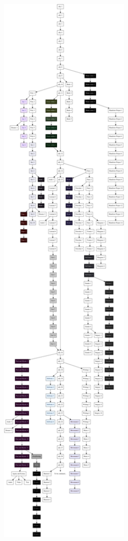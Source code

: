\begin{paracol}{2}
\begin{leftcolumn}
\newpage
\end{leftcolumn}
\begin{rightcolumn*}
\includegraphics[width=2.5in]{assets/map.png}
\end{rightcolumn*}
\begin{leftcolumn}


\end{leftcolumn}
\end{paracol}
